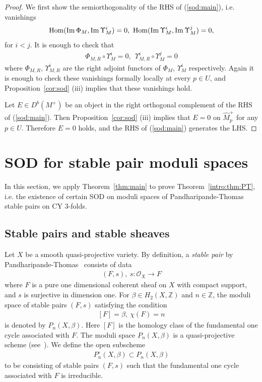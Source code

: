 \documentclass[11pt]{amsart}
\theoremstyle{plain}
\newcommand{\oO}{\mathcal{O}}
\newcommand{\Hom}{\mathop{\rm Hom}\nolimits}
\newcommand{\Imm}{\mathop{\rm Im}\nolimits}
\begin{document}
\begin{proof}
We first show the semiorthogonality of the RHS of (\ref{sod:main}), i.e.
vanishings 
\begin{align*}
\Hom(\Imm \Phi_M, \Imm \Upsilon_M^i)=0, \ 
\Hom(\Imm \Upsilon_M^i, \Imm \Upsilon_M^j)=0,
\end{align*}
for $i<j$.
It is enough to check that 
\begin{align*}
\Phi_{M, R} \circ \Upsilon_M^i=0, \ 
\ \Upsilon_{M, R}^i \circ \Upsilon_M^j=0
\end{align*}
where $\Phi_{M, R}$, $\Upsilon_{M, R}^i$ are the 
right adjoint functors of $\Phi_M$, $\Upsilon_M^i$ respectively. 
Again it is enough to check these vanishings
 formally locally at every $p\in U$, 
and Proposition~\ref{cor:sod} (iii) implies that these 
vanishings hold.

Let $E \in D^b(M^+)$ be an object 
in the right orthogonal complement of the RHS of (\ref{sod:main}). 
Then Proposition~\ref{cor:sod} (iii) 
 implies that $E=0$ on $\widehat{M}_p^+$ for any $p \in U$.
Therefore $E=0$ holds, 
and the RHS of (\ref{sod:main}) generates the LHS. 

\end{proof}



\section{SOD for stable pair moduli spaces}\label{sec:SODpair}
In this section, we apply Theorem~\ref{thm:main} 
to prove Theorem~\ref{intro:thm:PT}, i.e. 
the existence of certain SOD 
on moduli spaces of Pandharipande-Thomas
stable pairs on CY 3-folds. 
\subsection{Stable pairs and stable sheaves}
Let $X$ be a smooth quasi-projective 
variety. By definition, a \textit{stable pair} 
by Pandharipande-Thomas~\cite{PT}
consists of data
\begin{align*}
(F, s), \ s \colon \oO_X \to F
\end{align*}
where $F$ is a pure one dimensional 
coherent sheaf on $X$ with compact support, 
and $s$ is surjective in dimension one. 
For $\beta \in H_2(X, \mathbb{Z})$ and 
$n \in \mathbb{Z}$, 
the moduli space of stable pairs 
$(F, s)$ satisfying the condition
\begin{align}\label{ch:F}
[F]=\beta, \ \chi(F)=n
\end{align}
is
denoted by $P_n(X, \beta)$. 
Here $[F]$ is the homology class of the 
fundamental one cycle associated with $F$. 
The moduli space $P_n(X, \beta)$ is a quasi-projective 
scheme (see~\cite{PT}). 
We define the open subscheme
\begin{align*}
P_n^{\circ}(X, \beta) \subset P_n(X, \beta)
\end{align*}
to be consisting of 
stable pairs $(F, s)$ such that the 
fundamental one cycle associated with $F$ 
is irreducible. 
\end{document}
